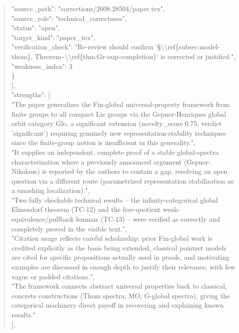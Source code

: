 \documentclass[11pt]{article}
\begin{document}
\begin{quote}
      "source\_path": "corrections/2608.28504/paper.tex",\\
      "source\_role": "technical\_correctness",\\
      "status": "open",\\
      "target\_kind": "paper\_tex",\\
      "verification\_check": "Re-review should confirm `§\textbackslash{}\textbackslash{}ref\{subsec:model-thom\}, Theorem\~{}\textbackslash{}\textbackslash{}ref\{thm:Gr-oup-completion\}` is corrected or justified.",\\
      "weakness\_index": 3\\
    \}\\
  ],\\
  "strengths": [\\
    "The paper generalizes the Fin-global universal-property framework from finite groups to all compact Lie groups via the Gepner-Henriques global orbit category Glo, a significant extension (novelty\_score 0.75, verdict 'significant') requiring genuinely new representation-stability techniques since the finite-group notion is insufficient in this generality.",\\
    "It supplies an independent, complete proof of a stable global-spectra characterization where a previously announced argument (Gepner-Nikolaus) is reported by the authors to contain a gap, resolving an open question via a different route (parametrized representation stabilization as a smashing localization).",\\
    "Two fully checkable technical results -- the infinity-categorical global Elmendorf theorem (TC-12) and the free-quotient weak-equivalence/pullback lemmas (TC-13) -- were verified as correctly and completely proved in the visible text.",\\
    "Citation usage reflects careful scholarship: prior Fin-global work is credited explicitly as the basis being extended, classical pointset models are cited for specific propositions actually used in proofs, and motivating examples are discussed in enough depth to justify their relevance, with few vague or padded citations.",\\
    "The framework connects abstract universal properties back to classical, concrete constructions (Thom spectra, MO, G-global spectra), giving the categorical machinery direct payoff in recovering and explaining known results."\\
  ],\\

\end{quote}
\end{document}
